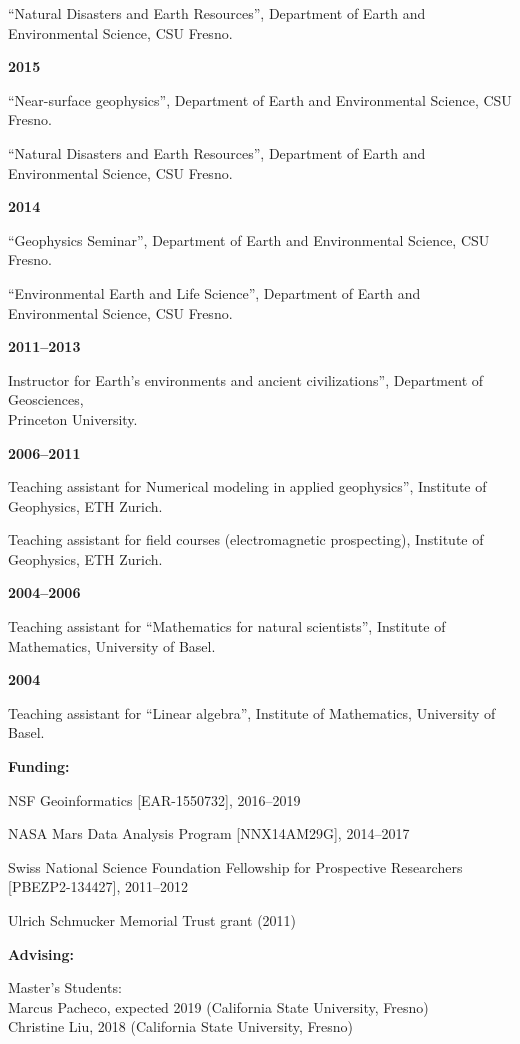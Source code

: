 \documentclass[10pt]{article}
\begin{document}
\spcp
``Natural Disasters and Earth Resources'', Department of Earth and Environmental Science, CSU Fresno.

\spcp
\textbf{2015}

``Near-surface geophysics'', Department of Earth and Environmental Science, CSU Fresno.

\spcp
``Natural Disasters and Earth Resources'', Department of Earth and Environmental Science, CSU Fresno.

\spcp
\textbf{2014}

``Geophysics Seminar'', Department of Earth and Environmental Science, CSU Fresno.

\spcp
``Environmental Earth and Life Science'', Department of Earth and Environmental Science, CSU Fresno.


\clearpage
\textbf{2011--2013}

Instructor for Earth's environments and ancient civilizations'', Department of Geosciences,\\ Princeton University.

\spcp
\textbf{2006--2011}

Teaching assistant for Numerical modeling in applied geophysics'',  Institute of Geophysics, ETH Zurich.

\spcp        
Teaching assistant for field courses (electromagnetic prospecting),
Institute of Geophysics, ETH Zurich.

\spcp
\textbf{2004--2006}

Teaching assistant for ``Mathematics for natural scientists'', Institute of Mathematics, University of Basel.

\spcp
\textbf{2004}

Teaching assistant for ``Linear algebra'', Institute of Mathematics, University of Basel.

\spc
\textbf{\tsize Funding:}

\spcp
  NSF Geoinformatics
  [EAR-1550732],
  2016--2019

 \spcp 
NASA Mars Data Analysis Program [NNX14AM29G], 2014--2017

\spcp
Swiss National Science Foundation Fellowship for Prospective Researchers
[PBEZP2-134427], 2011--2012

\spcp
Ulrich Schmucker Memorial Trust grant (2011)

\spc
\textbf{\tsize Advising:}

\spcp
Master's Students:\\
Marcus Pacheco, expected 2019 (California State University, Fresno)\\
Christine Liu, 2018 (California State University, Fresno)
\end{document}

